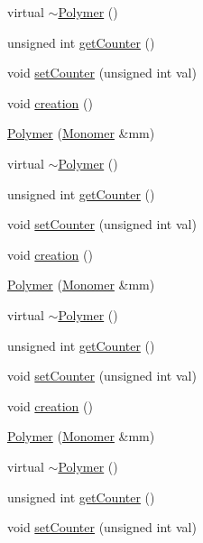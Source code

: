 \begin{DoxyCompactItemize}
\item 
virtual \mbox{\hyperlink{classPolymer_aac2b3983f375a5691c7d5ca1a79594d5}{$\sim$\+Polymer}} ()
\item 
unsigned int \mbox{\hyperlink{classPolymer_a8346d821e5f8690d7816ba1d40036b69}{get\+Counter}} ()
\item 
void \mbox{\hyperlink{classPolymer_a7ed6bbe09a570b59f9253d63fd3326d2}{set\+Counter}} (unsigned int val)
\item 
void \mbox{\hyperlink{classPolymer_a1daba3eb2ba8428bf2f3e814668b155f}{creation}} ()
\item 
\mbox{\hyperlink{classPolymer_ae77454a3908652e4df6a26b9cac509a5}{Polymer}} (\mbox{\hyperlink{classMonomer}{Monomer}} \&mm)
\item 
virtual \mbox{\hyperlink{classPolymer_aac2b3983f375a5691c7d5ca1a79594d5}{$\sim$\+Polymer}} ()
\item 
unsigned int \mbox{\hyperlink{classPolymer_a8346d821e5f8690d7816ba1d40036b69}{get\+Counter}} ()
\item 
void \mbox{\hyperlink{classPolymer_a7ed6bbe09a570b59f9253d63fd3326d2}{set\+Counter}} (unsigned int val)
\item 
void \mbox{\hyperlink{classPolymer_a1daba3eb2ba8428bf2f3e814668b155f}{creation}} ()
\item 
\mbox{\hyperlink{classPolymer_ae77454a3908652e4df6a26b9cac509a5}{Polymer}} (\mbox{\hyperlink{classMonomer}{Monomer}} \&mm)
\item 
virtual \mbox{\hyperlink{classPolymer_aac2b3983f375a5691c7d5ca1a79594d5}{$\sim$\+Polymer}} ()
\item 
unsigned int \mbox{\hyperlink{classPolymer_a8346d821e5f8690d7816ba1d40036b69}{get\+Counter}} ()
\item 
void \mbox{\hyperlink{classPolymer_a7ed6bbe09a570b59f9253d63fd3326d2}{set\+Counter}} (unsigned int val)
\item 
void \mbox{\hyperlink{classPolymer_a1daba3eb2ba8428bf2f3e814668b155f}{creation}} ()
\item 
\mbox{\hyperlink{classPolymer_ae77454a3908652e4df6a26b9cac509a5}{Polymer}} (\mbox{\hyperlink{classMonomer}{Monomer}} \&mm)
\item 
virtual \mbox{\hyperlink{classPolymer_aac2b3983f375a5691c7d5ca1a79594d5}{$\sim$\+Polymer}} ()
\item 
unsigned int \mbox{\hyperlink{classPolymer_a8346d821e5f8690d7816ba1d40036b69}{get\+Counter}} ()
\item 
void \mbox{\hyperlink{classPolymer_a7ed6bbe09a570b59f9253d63fd3326d2}{set\+Counter}} (unsigned int val)

\end{DoxyCompactItemize}
